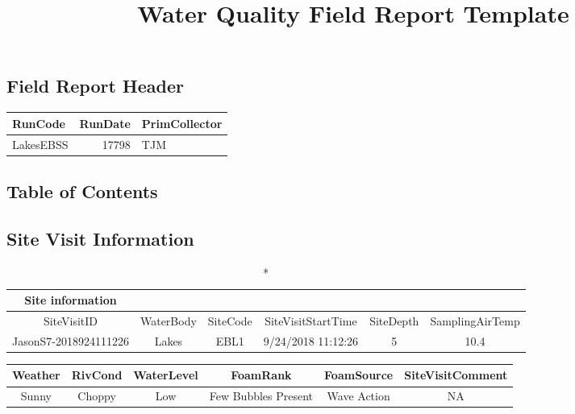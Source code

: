 \documentclass[
  letterpaper,
  DIV=11,
  numbers=noendperiod]{scrartcl}
\title{Water Quality Field Report Template}
\author{}
\date{}
\begin{document}
\maketitle
\ifdefined\Shaded\renewenvironment{Shaded}{\begin{tcolorbox}[interior hidden, sharp corners, borderline west={3pt}{0pt}{shadecolor}, enhanced, boxrule=0pt, breakable, frame hidden]}{\end{tcolorbox}}\fi

\hypertarget{field-report-header}{%
\subsection{Field Report Header}\label{field-report-header}}

\begin{longtable*}{lrl}
\toprule
RunCode & RunDate & PrimCollector \\ 
\midrule\addlinespace[2.5pt]
LakesEBSS & 17798 & TJM \\ 
\bottomrule
\end{longtable*}

\hypertarget{table-of-contents}{%
\subsection{Table of Contents}\label{table-of-contents}}

\hypertarget{site-visit-information}{%
\subsection{Site Visit Information}\label{site-visit-information}}

\begin{longtable*}{cccccc}
\caption*{
{\large Site information}
} \\ 
\toprule
SiteVisitID & WaterBody & SiteCode & SiteVisitStartTime & SiteDepth & SamplingAirTemp \\ 
\midrule\addlinespace[2.5pt]
JasonS7-2018924111226 & Lakes & EBL1 & 9/24/2018 11:12:26 & 5 & 10.4 \\ 
\bottomrule
\end{longtable*}

\begin{longtable*}{cccccc}
\toprule
Weather & RivCond & WaterLevel & FoamRank & FoamSource & SiteVisitComment \\ 
\midrule\addlinespace[2.5pt]
Sunny & Choppy & Low & Few Bubbles Present & Wave Action & NA \\ 
\bottomrule
\end{longtable*}
\end{document}
